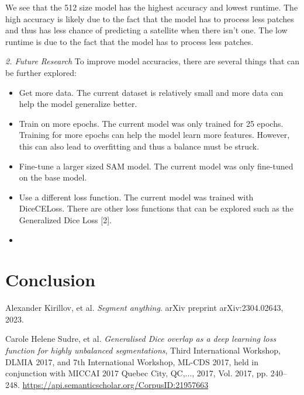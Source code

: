 \documentclass{article}
\begin{document}
We see that the 512 size model has the highest accuracy and lowest runtime. The high accuracy is likely due to the fact that the model has to process less patches and thus has less chance of predicting a satellite when there isn't one. The low runtime is due to the fact that the model has to process less patches. 

\textit{2. Future Research}
To improve model accuracies, there are several things that can be further explored:
\begin{itemize}
    \item Get more data. The current dataset is relatively small and more data can help the model generalize better.
    \item Train on more epochs. The current model was only trained for 25 epochs. Training for more epochs can help the model learn more features. However, this can also lead to overfitting and thus a balance must be struck.
    \item Fine-tune a larger sized SAM model. The current model was only fine-tuned on the base model.
    \item Use a different loss function. The current model was trained with DiceCELoss. There are other loss functions that can be explored such as the Generalized Dice Loss [2].
    \item 
\end{itemize}

\medskip

\section*{Conclusion}


\medskip

\begin{thebibliography}{9}

        Alexander Kirillov, et al. 
        \textit{Segment anything}. 
        arXiv preprint arXiv:2304.02643, 2023.
    
        Carole Helene Sudre, et al.
        \textit{Generalised Dice overlap as a deep learning loss function for highly unbalanced segmentations},
        Third International Workshop, DLMIA 2017, and 7th International Workshop, ML-CDS 2017, held in conjunction with MICCAI 2017 Quebec City, QC,...,
        2017, Vol. 2017, pp. 240--248.
        \url{https://api.semanticscholar.org/CorpusID:21957663}
    

\end{thebibliography}
\end{document}
